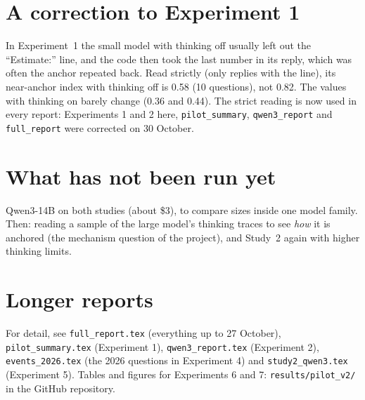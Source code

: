 \documentclass[11pt,a4paper]{article}
\begin{document}
\section*{A correction to Experiment 1}
In Experiment~1 the small model with thinking off usually left out the \enquote{Estimate:} line, and the code then took the last number in its reply, which was often the anchor repeated back. Read strictly (only replies with the line), its near-anchor index with thinking off is 0.58 (10 questions), not 0.82. The values with thinking on barely change (0.36 and 0.44). The strict reading is now used in every report: Experiments 1 and 2 here, \texttt{pilot\_summary}, \texttt{qwen3\_report} and \texttt{full\_report} were corrected on 30 October.

\section*{What has not been run yet}
Qwen3-14B on both studies (about \$3), to compare sizes inside one model family. Then: reading a sample of the large model's thinking traces to see \emph{how} it is anchored (the mechanism question of the project), and Study~2 again with higher thinking limits.

\section*{Longer reports}
For detail, see \texttt{full\_report.tex} (everything up to 27 October), \texttt{pilot\_summary.tex} (Experiment 1), \texttt{qwen3\_report.tex} (Experiment 2), \texttt{events\_2026.tex} (the 2026 questions in Experiment 4) and \texttt{study2\_qwen3.tex} (Experiment 5). Tables and figures for Experiments 6 and 7: \texttt{results/pilot\_v2/} in the GitHub repository.
\end{document}
